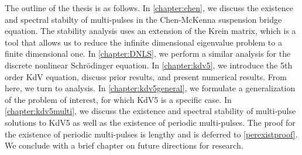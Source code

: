 \documentclass[thesis2.tex]{subfiles}
\begin{document}
The outline of the thesis is as follows. In \cref{chapter:chen}, we discuss the existence and spectral stabilty of multi-pulses in the Chen-McKenna suspension bridge equation. The stability analysis uses an extension of the Krein matrix, which is a tool that allows us to reduce the infinite dimensional eigenvalue problem to a finite dimensional one. In \cref{chapter:DNLS}, we perform a similar analysis for the discrete nonlinear Schr{\"o}dinger equation. In \cref{chapter:kdv5}, we introduce the 5th order KdV equation, discuss prior results, and present numerical results. From here, we turn to analysis. In \cref{chapter:kdv5general}, we formulate a generalization of the problem of interest, for which KdV5 is a specific case. In \cref{chapter:kdv5multi}, we discuss the existence and spectral stability of multi-pulse solutions to KdV5 as well as the existence of periodic multi-pulses. The proof for the existence of periodic multi-pulses is lengthy and is deferred to \cref{perexistproof}. We conclude with a brief chapter on future directions for research.

\iffulldocument\else
	
	
\fi
\end{document}

